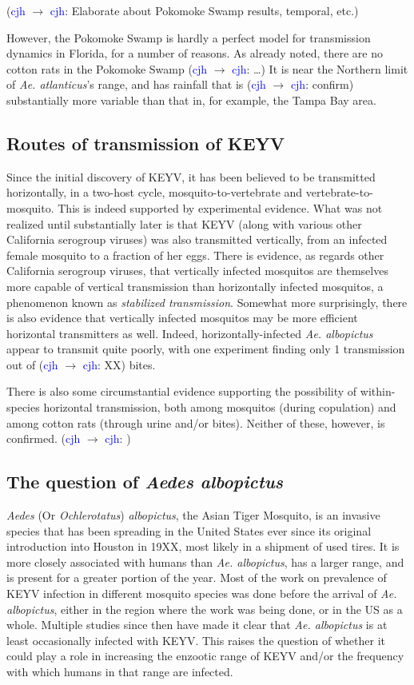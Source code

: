 \documentclass[12pt]{article}
\newcommand{\cjh}{\textcolor{blue}{cjh}}
\newcommand{\msg}[3]{(#1 $\rightarrow$ #2: #3)}
\newcommand{\mcc}[1]{\msg\cjh\cjh{#1}}
\begin{document}
            \mcc{Elaborate about Pokomoke Swamp results, temporal, etc.}
            
            However, the Pokomoke Swamp is hardly a perfect model for transmission dynamics in Florida, for a number of reasons. As already noted, there are no cotton rats in the Pokomoke Swamp \mcc{\dots} It is near the Northern limit of \textit{Ae. atlanticus}'s range, and has rainfall that is \mcc{confirm} substantially more variable than that in, for example, the Tampa Bay area.

        \subsection{Routes of transmission of KEYV}
            Since the initial discovery of KEYV, it has been believed to be transmitted horizontally, in a two-host cycle, mosquito-to-vertebrate and vertebrate-to-mosquito. This is indeed supported by experimental evidence. What was not realized until substantially later is that KEYV (along with various other California serogroup viruses) was also transmitted vertically, from an infected female mosquito to a fraction of her eggs. There is evidence, as regards other California serogroup viruses, that vertically infected mosquitos are themselves more capable of vertical transmission than horizontally infected mosquitos, a phenomenon known as \textit{stabilized transmission}. Somewhat more surprisingly, there is also evidence that vertically infected mosquitos may be more efficient horizontal transmitters as well. Indeed, horizontally-infected \textit{Ae. albopictus} appear to transmit quite poorly, with one experiment finding only 1 transmission out of \mcc{XX} bites.

            There is also some circumstantial evidence supporting the possibility of within-species horizontal transmission, both among mosquitos (during copulation) and among cotton rats (through urine and/or bites). Neither of these, however, is confirmed. \mcc{}

        \subsection{The question of \textit{Aedes albopictus}}
            \textit{Aedes} (Or \textit{Ochlerotatus}) \textit{albopictus}, the Asian Tiger Mosquito, is an invasive species that has been spreading in the United States ever since its original introduction into Houston in 19XX, most likely in a shipment of used tires. It is more closely associated with humans than \textit{Ae. albopictus}, has a larger range, and is present for a greater portion of the year. Most of the work on prevalence of KEYV infection in different mosquito species was done before the arrival of \textit{Ae. albopictus}, either in the region where the work was being done, or in the US as a whole. Multiple studies since then have made it clear that \textit{Ae. albopictus} is at least occasionally infected with KEYV. This raises the question of whether it could play a role in increasing the enzootic range of KEYV and/or the frequency with which humans in that range are infected.
\end{document}
